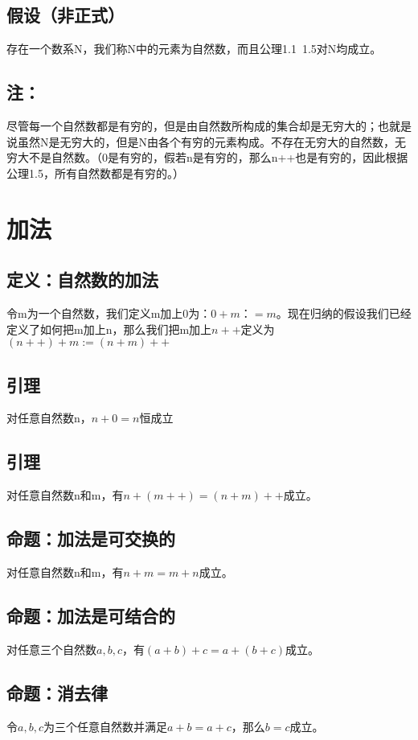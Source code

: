 \documentclass{article}
\begin{document}
\subsection{假设（非正式）}
存在一个数系N，我们称N中的元素为自然数，而且公理1.1~1.5对N均成立。

\subsection{注：}
尽管每一个自然数都是有穷的，但是由自然数所构成的集合却是无穷大的；也就是说虽然N是无穷大的，但是N由各个有穷的元素构成。不存在无穷大的自然数，无穷大不是自然数。（0是有穷的，假若n是有穷的，那么n++也是有穷的，因此根据公理1.5，所有自然数都是有穷的。）


\section{加法}
\subsection{定义：自然数的加法}
令m为一个自然数，我们定义m加上0为：$ 0+m：=m $。现在归纳的假设我们已经定义了如何把m加上n，那么我们把m加上$ n++ $定义为$ (n++)+m:=(n+m)++ $

\subsection{引理}
对任意自然数n，$ n+0=n $恒成立

\subsection{引理}
对任意自然数n和m，有$ n+(m++)=(n+m)++ $成立。

\subsection{命题：加法是可交换的}
对任意自然数n和m，有$ n+m=m+n $成立。

\subsection{命题：加法是可结合的}
对任意三个自然数$ a,b,c $，有$ (a+b)+c=a+(b+c) $成立。

\subsection{命题：消去律}
令$ a,b,c $为三个任意自然数并满足$ a+b=a+c $，那么$ b=c $成立。
\end{document}
